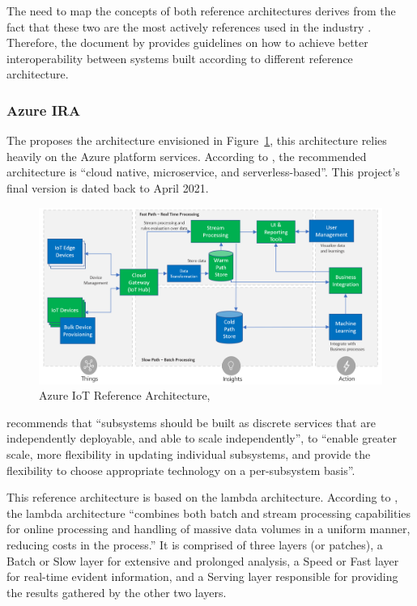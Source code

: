 The need to map the concepts of both reference architectures derives from the fact that these two are the most actively references used in the industry \parencite{DIAS2022100529}. Therefore, the document by \cite{iira-inter-rami} provides guidelines on how to achieve better interoperability between systems built according to different reference architecture. 

\subsubsection{Azure IRA}
\label{subsubsec:stateofart:arch:azure}

The  proposes the architecture envisioned in Figure~\ref{fig:stateofart:arch:azure:ira}, this architecture relies heavily on the Azure platform services. According to \cite{azure-ira}, the recommended architecture is ``cloud native, microservice, and serverless-based''. This project's final version is dated back to April 2021.

\begin{figure}[H]
    \centering
    \includegraphics[scale=0.35]{
        assets/figures/azure.png
    }
    \caption[Azure IoT Reference Architecture]{Azure IoT Reference Architecture, \cite{azure-ira}}
    \label{fig:stateofart:arch:azure:ira}
\end{figure}

\cite{azure-ira} recommends that ``subsystems should be built as discrete services that are independently deployable, and able to scale independently'', to ``enable greater scale, more flexibility in updating individual subsystems, and provide the flexibility to choose appropriate technology on a per-subsystem basis''.

This reference architecture is based on the lambda architecture. According to \cite{kiran2015lambda}, the lambda architecture ``combines both batch and stream processing capabilities for online processing and handling of massive data volumes in a uniform manner, reducing costs in the process.''
It is comprised of three layers (or patches), a Batch or Slow layer for extensive and prolonged analysis, a Speed or Fast layer for real-time evident information, and a Serving layer responsible for providing the results gathered by the other two layers.

